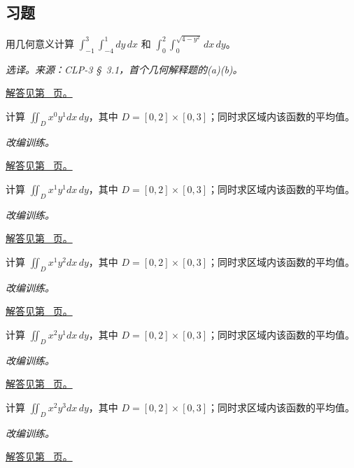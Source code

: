 \documentclass[12pt,fontset=fandol]{ctexart}
\begin{document}
\subsection{习题}
\begin{example}[不作累次积分的几何计算]\label{ex:c36q1}
用几何意义计算 $\int_{-1}^{3}\int_{-4}^{1}dy\,dx$ 和 $\int_0^2\int_0^{\sqrt{4-y^2}}dx\,dy$。
\par\textit{选译。来源：CLP-3 \S~3.1，首个几何解释题的(a)(b)。}\par\hyperref[ans:c36q1]{解答见第~\pageref{ans:c36q1} 页。}
\end{example}
\begin{example}[矩形区域上的乘积分离]\label{ex:c36q2}
计算 $\displaystyle\iint_Dx^{0}y^{1}dx\,dy$，其中 $D=[0,2]\times[0,3]$；同时求区域内该函数的平均值。
\par\textit{改编训练。}\par\hyperref[ans:c36q2]{解答见第~\pageref{ans:c36q2} 页。}
\end{example}
\begin{example}[矩形区域上的乘积分离]\label{ex:c36q3}
计算 $\displaystyle\iint_Dx^{1}y^{1}dx\,dy$，其中 $D=[0,2]\times[0,3]$；同时求区域内该函数的平均值。
\par\textit{改编训练。}\par\hyperref[ans:c36q3]{解答见第~\pageref{ans:c36q3} 页。}
\end{example}
\begin{example}[矩形区域上的乘积分离]\label{ex:c36q4}
计算 $\displaystyle\iint_Dx^{1}y^{2}dx\,dy$，其中 $D=[0,2]\times[0,3]$；同时求区域内该函数的平均值。
\par\textit{改编训练。}\par\hyperref[ans:c36q4]{解答见第~\pageref{ans:c36q4} 页。}
\end{example}
\begin{example}[矩形区域上的乘积分离]\label{ex:c36q5}
计算 $\displaystyle\iint_Dx^{2}y^{1}dx\,dy$，其中 $D=[0,2]\times[0,3]$；同时求区域内该函数的平均值。
\par\textit{改编训练。}\par\hyperref[ans:c36q5]{解答见第~\pageref{ans:c36q5} 页。}
\end{example}
\begin{example}[矩形区域上的乘积分离]\label{ex:c36q6}
计算 $\displaystyle\iint_Dx^{2}y^{3}dx\,dy$，其中 $D=[0,2]\times[0,3]$；同时求区域内该函数的平均值。
\par\textit{改编训练。}\par\hyperref[ans:c36q6]{解答见第~\pageref{ans:c36q6} 页。}
\end{example}
\end{document}
